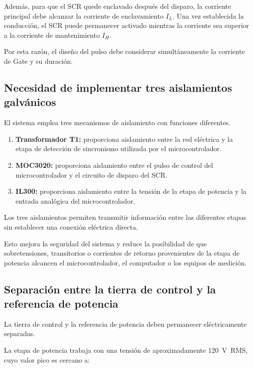 \documentclass[12pt]{article}
\begin{document}
Además, para que el SCR quede enclavado después del disparo, la corriente
principal debe alcanzar la corriente de enclavamiento $I_L$. Una vez
establecida la conducción, el SCR puede permanecer activado mientras la
corriente sea superior a la corriente de mantenimiento $I_H$.

Por esta razón, el diseño del pulso debe considerar simultáneamente la
corriente de Gate y su duración.

\subsection{Necesidad de implementar tres aislamientos galvánicos}

El sistema emplea tres mecanismos de aislamiento con funciones diferentes.

\begin{enumerate}
    \item \textbf{Transformador T1:} proporciona aislamiento entre la red
    eléctrica y la etapa de detección de sincronismo utilizada por el
    microcontrolador.

    \item \textbf{MOC3020:} proporciona aislamiento entre el pulso de control
    del microcontrolador y el circuito de disparo del SCR.

    \item \textbf{IL300:} proporciona aislamiento entre la tensión de la
    etapa de potencia y la entrada analógica del microcontrolador.
\end{enumerate}

Los tres aislamientos permiten transmitir información entre las diferentes
etapas sin establecer una conexión eléctrica directa.

Esto mejora la seguridad del sistema y reduce la posibilidad de que
sobretensiones, transitorios o corrientes de retorno provenientes de la
etapa de potencia alcancen el microcontrolador, el computador o los equipos
de medición.

\subsection{Separación entre la tierra de control y la referencia de potencia}

La tierra de control y la referencia de potencia deben permanecer
eléctricamente separadas.

La etapa de potencia trabaja con una tensión de aproximadamente
\SI{120}{V RMS}, cuyo valor pico es cercano a:
\end{document}
